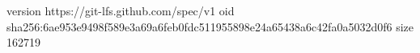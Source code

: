 version https://git-lfs.github.com/spec/v1
oid sha256:6ae953e9498f589e3a69a6feb0fdc511955898e24a65438a6c42fa0a5032d0f6
size 162719
